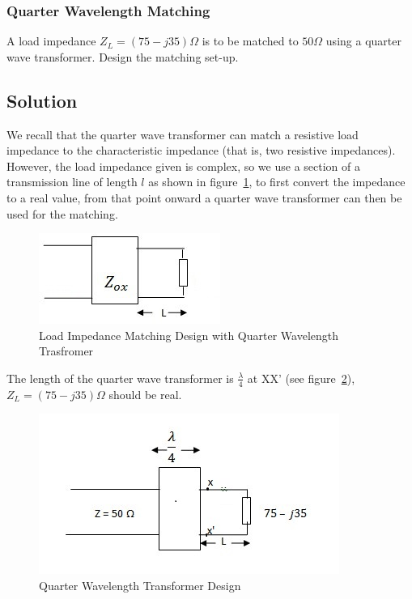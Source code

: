 \begin{exmp}
\subsubsection*{Quarter Wavelength Matching}
A load impedance $Z_{L}=(75-j35)\varOmega$ is to be matched to $50\varOmega$ using a quarter wave transformer. Design the matching set-up. 

\subsection*{Solution}
We recall that the quarter wave transformer can match a resistive load impedance to the characteristic impedance (that is, two resistive impedances). However, the load impedance given is complex, so we use a section of a transmission line of length $l$ as shown in figure~\ref{fig;fighalfwave}, to first convert the impedance to a real value, from that point onward a quarter wave transformer can then be used for the matching.
\begin{figure}[h]
\centering
\includegraphics[width=0.7\linewidth]{./graphics/fighalfwave}
\caption{Load Impedance Matching Design with Quarter Wavelength Trasfromer}
\label{fig;fighalfwave}
\end{figure}

The length of the quarter wave transformer is $\frac{\lambda}{4}$ at XX' (see figure~\ref{fig:image}), $Z_L = (75-j35)\varOmega$ should be real.
\begin{figure}[h]
\centering
\includegraphics[width=1\linewidth]{./graphics/image}
\caption{Quarter Wavelength Transformer Design}
\label{fig:image}
\end{figure}


\end{exmp}
